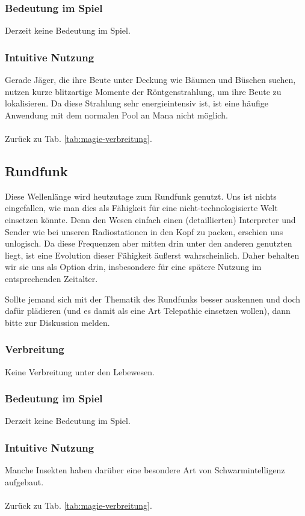 \subsubsection{Bedeutung im Spiel}
Derzeit keine Bedeutung im Spiel.

\subsubsection{Intuitive Nutzung}
Gerade Jäger, die ihre Beute unter Deckung wie Bäumen und Büschen suchen, nutzen kurze blitzartige Momente der Röntgenstrahlung, um ihre Beute zu lokalisieren.
Da diese Strahlung sehr energieintensiv ist, ist eine häufige Anwendung mit dem normalen Pool an Mana nicht möglich.
\\ \\
Zurück zu Tab. \ref{tab:magie-verbreitung}.



\subsection{Rundfunk}\label{magie:rundfunk}
Diese Wellenlänge wird heutzutage zum Rundfunk genutzt.
Uns ist nichts eingefallen, wie man dies als Fähigkeit für eine nicht-technologisierte Welt einsetzen könnte.
Denn den Wesen einfach einen (detaillierten) Interpreter und Sender wie bei unseren Radiostationen in den Kopf zu packen, erschien uns unlogisch.
Da diese Frequenzen aber mitten drin unter den anderen genutzten liegt, ist eine Evolution dieser Fähigkeit äußerst wahrscheinlich.
Daher behalten wir sie uns als Option drin, insbesondere für eine spätere Nutzung im entsprechenden Zeitalter.

Sollte jemand sich mit der Thematik des Rundfunks besser auskennen und doch dafür plädieren (und es damit als eine Art Telepathie einsetzen wollen), dann bitte zur Diskussion melden.

\subsubsection{Verbreitung}
Keine Verbreitung unter den Lebewesen.

\subsubsection{Bedeutung im Spiel}
Derzeit keine Bedeutung im Spiel.

\subsubsection{Intuitive Nutzung}
Manche Insekten haben darüber eine besondere Art von Schwarmintelligenz aufgebaut.
\\ \\
Zurück zu Tab. \ref{tab:magie-verbreitung}.



